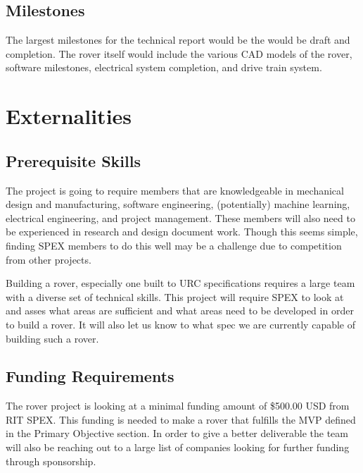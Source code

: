 \documentclass[conference]{IEEEtran} %
\begin{document}
\subsection{Milestones}
\label{subsec:milestones}
The largest milestones for the technical report would be the would be draft and completion. 
The rover itself would include the various CAD models of the rover, software milestones, electrical system completion, and drive train system. 

\section{Externalities}
\subsection{Prerequisite Skills}
The project is going to require members that are knowledgeable in mechanical design and manufacturing, software engineering, (potentially) machine learning, electrical engineering, and project management. These members will also need to be experienced in research and design document work. Though this seems simple, finding SPEX members to do this well may be a challenge due to competition from other projects. 

Building a rover, especially one built to URC specifications requires a large team with a diverse set of technical skills. 
This project will require SPEX to look at and asses what areas are sufficient and what areas need to be developed in order to build a rover. 
It will also let us know to what spec we are currently capable of building such a rover. 

\subsection{Funding Requirements}

The rover project is looking at a minimal funding amount of \$500.00 USD from RIT SPEX. This funding is needed to make a rover that fulfills the MVP defined in the Primary Objective section. In order to give a better deliverable the team will also be reaching out to a large list of companies looking for further funding through sponsorship. 
\end{document}
